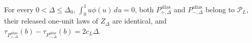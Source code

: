 For every \(0<\Delta\leq\Delta_0\), \(\int_0^1u\phi(u)\,du=0\), both \(P^{\mathrm{alias}}_{+,\Delta}\) and \(P^{\mathrm{alias}}_{-,\Delta}\) belong to \(\mathcal P_L\), their released one-unit laws of \(Z_\Delta\) are identical, and \(\tau_{P^{\mathrm{alias}}_{+,\Delta}}(b)-\tau_{P^{\mathrm{alias}}_{-,\Delta}}(b)=2c_L\Delta\).